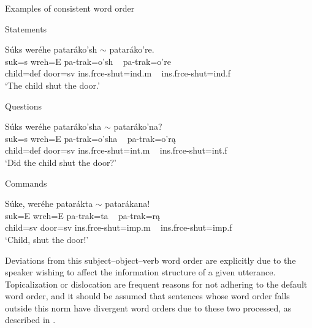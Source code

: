 \begin{exe}
    \item\label{Ch5WordOrderIllocutionaryForce} Examples of consistent word order

    \begin{xlist}
        \item\label{Ch5WordOrderIllocutionaryForceA} Statements

        \glll Súks weréhe pataráko'sh $\sim$ pataráko're.\\
        suk=s wreh=E pa-trak=o'sh ~ pa-trak=o're\\
        \textnormal{child}=def \textnormal{door}=sv ins.frce-\textnormal{shut}=ind.m ~ ins.frce-\textnormal{shut}=ind.f\\
        \glt `The child shut the door.'

        \item\label{Ch5WordOrderIllocutionaryForceB} Questions

        \glll Súks weréhe pataráko'sha $\sim$ pataráko'na?\\
        suk=s wreh=E pa-trak=o'sha ~ pa-trak=o'rą\\
        \textnormal{child}=def \textnormal{door}=sv ins.frce-\textnormal{shut}=int.m ~ ins.frce-\textnormal{shut}=int.f\\
        \glt `Did the child shut the door?'

        \item\label{Ch5WordOrderIllocutionaryForceC} Commands

        \glll Súke, weréhe patarákta $\sim$ patarákana!\\
        suk=E wreh=E pa-trak=ta ~ pa-trak=rą\\
        \textnormal{child}=sv \textnormal{door}=sv ins.frce-\textnormal{shut}=imp.m ~ ins.frce-\textnormal{shut}=imp.f\\
        \glt `Child, shut the door!'

    \end{xlist}
\end{exe}

Deviations from this subject--object--verb word order are explicitly due to the speaker wishing to affect the information structure of a given utterance. Topicalization or dislocation are frequent reasons for not adhering to the default word order, and it should be assumed that sentences whose word order falls outside this norm have divergent word orders due to these two processed, as described in .


